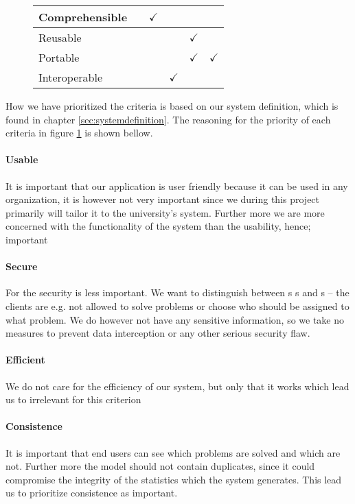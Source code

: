 \begin{figure}[htbp]
\begin{tabular}{| l | m{} | m{}| m{}| m{}|m{}|}
		Comprehensible  		& 																				& \multicolumn{1}{c|}{$\checkmark$} 		& 																		& 																	& 																	\\ \hline
		Reusable  					& 																				& 																			& 																		& \multicolumn{1}{c|}{$\checkmark$} & 																	\\ \hline
		Portable 						& 																				& 																			& 																		& \multicolumn{1}{c|}{$\checkmark$} &	\multicolumn{1}{c|}{$\checkmark$} \\ \hline
		Interoperable 			& 																				& 																			& \multicolumn{1}{c|}{$\checkmark$} 	& 																	& 																	\\ \hline
		\end{tabular}
	\label{fig:prioritizedCrit}
\end{figure}

How we have prioritized the criteria is based on our system definition, which is found in chapter \ref{sec:systemdefinition}. The reasoning for the priority of each criteria in figure \ref{fig:prioritizedCrit} is shown bellow.

\paragraph{Usable}
It is important that our application is user friendly because it can be used in any organization, it is however not very important since we during this project primarily will tailor it to the university's system.
Further more we are more concerned with the functionality of the system than the usability, hence; important 
\paragraph{Secure}
For the \hdesk[] security is less important. We want to distinguish between \aclient s \astaff s and \admin s -- the clients are e.g. not allowed to solve problems or choose who should be assigned to what problem.
We do however not have any sensitive information, so we take no measures to prevent data interception or any other serious security flaw.
\paragraph{Efficient}
We do not care for the efficiency of our system, but only that it works which lead us to irrelevant for this criterion 
\paragraph{Consistence}
It is important that end users can see which problems are solved and which are not.
Further more the \hdesk[] model should not contain duplicates, since it could compromise the integrity of the statistics which the system generates.
This lead us to prioritize consistence as important.
